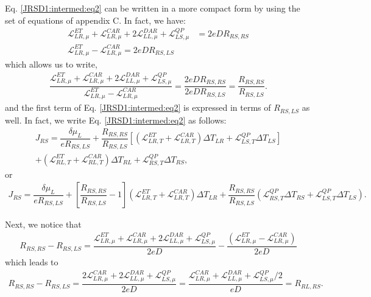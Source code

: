 Eq. \eqref{JRSD1:intermed:eq2} can be written in a more compact form by using the set of equations of appendix C. In fact, we have:
\begin{align*}
\mathcal{L}_{LR,\mu}^{ET}+\mathcal{L}_{LR,\mu}^{CAR}+2\mathcal{L}_{LL,\mu}^{DAR}+\mathcal{L}^{QP}_{LS,\mu}
&=
2eDR_{RS,RS}
\\
\mathcal{L}_{LR,\mu}^{ET}-\mathcal{L}_{LR,\mu}^{CAR}=2eDR_{RS,LS}
\end{align*}
which allows us to write, 
\begin{align*}
\dfrac{\mathcal{L}_{LR,\mu}^{ET}+\mathcal{L}_{LR,\mu}^{CAR}+2\mathcal{L}_{LL,\mu}^{DAR}+\mathcal{L}^{QP}_{LS,\mu}}{\mathcal{L}_{LR,\mu}^{ET}-\mathcal{L}_{LR,\mu}^{CAR}}
=
\dfrac{2eDR_{RS,RS}}{2eDR_{RS,LS}}
=
\dfrac{R_{RS,RS}}{R_{RS,LS}}.
\end{align*}
and the first term of Eq. \eqref{JRSD1:intermed:eq2} is expressed in terms of $R_{RS,LS}$ as well. In fact, we write Eq. \eqref{JRSD1:intermed:eq2} as follows:
\begin{multline*}
J_{RS}=
\dfrac{\delta\mu_{L}}{eR_{RS,LS}}
+
\dfrac{R_{RS,RS}}{R_{RS,LS}}[
(\mathcal{L}_{LR,T}^{ET}+\mathcal{L}_{LR,T}^{CAR})\Delta T_{LR}
+
\mathcal{L}^{QP}_{LS,T}\Delta T_{LS}]
\\+
(\mathcal{L}_{RL,T}^{ET}+\mathcal{L}_{RL,T}^{CAR})\Delta T_{RL}
+
\mathcal{L}^{QP}_{RS,T}\Delta T_{RS},
\end{multline*}
or
\begin{align}\label{JRSD1:intermed:eq4}
J_{RS}=
\dfrac{\delta\mu_{L}}{eR_{RS,LS}}
+
\left[\dfrac{R_{RS,RS}}{R_{RS,LS}}-1\right]
(\mathcal{L}_{LR,T}^{ET}+\mathcal{L}_{LR,T}^{CAR})\Delta T_{LR}
+
\dfrac{R_{RS,RS}}{R_{RS,LS}}(\mathcal{L}^{QP}_{RS,T}\Delta T_{RS}+\mathcal{L}^{QP}_{LS,T}\Delta T_{LS}).
\end{align}

Next, we notice that 
\begin{align*}
R_{RS,RS}-R_{RS,LS}
=\dfrac{\mathcal{L}_{LR,\mu}^{ET}+\mathcal{L}_{LR,\mu}^{CAR}+2\mathcal{L}_{LL,\mu}^{DAR}+\mathcal{L}^{QP}_{LS,\mu}}{2eD}
-\dfrac{(\mathcal{L}_{LR,\mu}^{ET}-\mathcal{L}_{LR,\mu}^{CAR})}{2eD}
\end{align*}
which leads to
\begin{align*}
R_{RS,RS}-R_{RS,LS}
=\dfrac{2\mathcal{L}_{LR,\mu}^{CAR}+2\mathcal{L}_{LL,\mu}^{DAR}+\mathcal{L}^{QP}_{LS,\mu}}{2eD}
=
\dfrac{\mathcal{L}_{LR,\mu}^{CAR}+\mathcal{L}_{LL,\mu}^{DAR}+\mathcal{L}^{QP}_{LS,\mu}/2}{eD}
=
R_{RL,RS}.
\end{align*}

